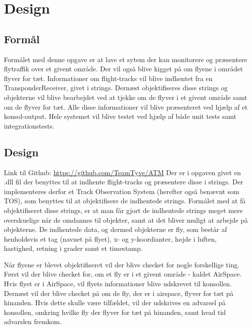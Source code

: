 \graphicspath{{Billeder/}}

\chapter{Design}
\section{Formål}
Formålet med denne opgave er at lave et sytem der kan monitorere og præsentere flytraffik over et givent område. Der vil også blive kigget på om flyene i området flyver for tæt. Informationer om flight-tracks vil blive indhentet fra en TransponderReceiver, givet i strings. Dernæst objektifiseres disse strings og objekterne vil blive bearbejdet ved at tjekke om de flyver i et givent område samt om de flyver for tæt. Alle disse informationer vil blive præsenteret ved hjælp af et konsol-output.
Hele systemet vil blive testet ved hjælp af både unit tests samt integrationstests.


\section{Design}
Link til Github: \url{https://github.com/TeamTyve/ATM} \newline \newline 
Der er i opgaven givet en .dll fil der benyttes til at indhente flight-tracks og præsentere disse i strings. Der implementeres derfor et Track Observation System (herefter også benævnt som TOS), som benyttes til at objektifisere de indhentede strings. \tabularnewline
Formålet med at få objektifiseret disse strings, er at man får gjort de indhentede strings meget mere overskuelige når de omdannes til objekter, samt at det bliver muligt at arbejde på objekterne. \newline
De indhentede data, og dermed objekterne er fly, som består af henholdsvis et tag (navnet på flyet), x- og y-koordianter, højde i luften, hastighed, retning i grader samt et timestamp. \newline

Når flyene er blevet objektifiseret vil der blive checket for nogle forskellige ting. \tabularnewline
Først vil der blive checket for, om et fly er i et givent område - kaldet AirSpace. Hvis flyet er i AirSpace, vil flyets informationer blive udskrevet til konsollen.
Dernæst vil der blive checket på om de fly, der er i airspace, flyver for tæt på hinanden. Hvis dette skulle være tilfældet, vil der udskrives en advarsel på konsollen, omkring hvilke fly der flyver for tæt på hinanden, samt hvad tid advarslen fremkom. \newline

